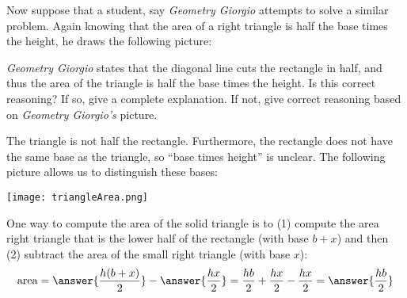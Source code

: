 \documentclass[nooutcomes]{ximera}
\begin{document}
\begin{problem}
Now suppose that a student, say \textit{Geometry Giorgio} attempts to
solve a similar problem. Again knowing that the area of a right
triangle is half the base times the height, he draws the following
picture:
\begin{image}
\end{image}
\textit{Geometry Giorgio} states that the diagonal line cuts the
rectangle in half, and thus the area of the triangle is half the base
times the height. Is this correct reasoning? If so, give a complete
explanation. If not, give correct reasoning based on \textit{Geometry
  Giorgio's} picture.
\begin{freeResponse}
\begin{hint}
The triangle is not half the rectangle.  Furthermore, the rectangle does not have the same base as the triangle, so ``base times height'' is unclear.  The following picture allows us to distinguish these bases:  
\begin{image}
\texttt{[image: triangleArea.png]}
\end{image}
One way to compute the area of the solid triangle is to (1) compute the area right triangle that is the lower half of the rectangle (with base $b+x$) and then (2) subtract the area of the small right triangle (with base $x$): 
\[
\mathrm{area} =  \answer{\frac{h(b+x)}{2}} - \answer{\frac{hx}{2}}= \frac{hb}{2} + \frac{hx}{2} - \frac{hx}{2} = \answer{\frac{hb}{2}}
\]
\end{hint}
\end{freeResponse}
\end{problem}
\end{document}
